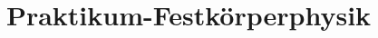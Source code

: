 

\subject{Photolumineszenz (PL)}
\title{Praktikum-Festkörperphysik}


\maketitle
\thispagestyle{empty}
\tableofcontents
\newpage







\nocite{*}
\printbibliography{}


